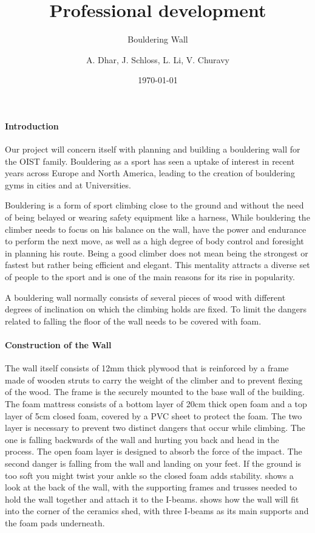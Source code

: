\documentclass[a4paper, 12pt]{scrartcl}
\date{\today}
\title{Professional development}
\subtitle{Bouldering Wall}
\author{A. Dhar, J. Schloss, L. Li, V. Churavy}
\begin{document}
\maketitle
\paragraph{Introduction}
Our project will concern itself with planning and building a bouldering wall for the OIST family.
Bouldering as a sport has seen a uptake of interest in recent years across Europe and North America, leading to the creation of bouldering gyms in cities and at Universities. 

Bouldering is a form of sport climbing close to the ground and without the need of being belayed or wearing safety equipment like a harness, While bouldering the climber needs to focus on his balance on the wall, have the power and endurance to perform the next move, as well as a high degree of body control and foresight in planning his route. Being a good climber does not mean being the strongest or fastest but rather being efficient and elegant. This mentality attracts a diverse set of people to the sport and is one of the main reasons for its rise in popularity.

A bouldering wall normally consists of several pieces of wood with different degrees of inclination on which the climbing holds are fixed. To limit the dangers related to falling the floor of the wall needs to be covered with foam.

\paragraph{Construction of the Wall}
The wall itself consists of 12mm thick plywood that is reinforced by a frame made of wooden struts to carry the weight of the climber and to prevent flexing of the wood. The frame is the securely mounted to the base wall of the building. 
The foam mattress consists of a bottom layer of 20cm thick open foam and a top layer of 5cm closed foam, covered by a PVC sheet to protect the foam.
The two layer is necessary to prevent two distinct dangers that occur while climbing. The one is falling backwards of the wall and hurting you back and head in the process. The open foam layer is designed to absorb the force of the impact. The second danger is falling from the wall and landing on your feet. If the ground is too soft you might twist your ankle so the closed foam adds stability.
 shows a look at the back of the wall, with the supporting frames and trusses needed to hold the wall together and attach it to the I-beams.  shows how the wall will fit into the corner of the ceramics shed, with three I-beams as its main supports and the foam pads underneath.
\end{document}
